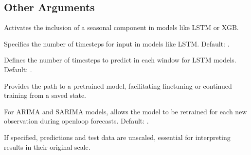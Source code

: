 \documentclass[letterpaper,10pt,english]{sphinxmanual}
\begin{document}
\subsection{Other Arguments}
\label{\detokenize{docs/parser_arguments:other-arguments}}\begin{description}
\sphinxAtStartPar
Activates the inclusion of a seasonal component in models like LSTM or XGB.

\sphinxAtStartPar
Specifies the number of timesteps for input in models like LSTM. Default: .

\sphinxAtStartPar
Defines the number of timesteps to predict in each window for LSTM models. Default: .

\sphinxAtStartPar
Provides the path to a pre\sphinxhyphen{}trained model, facilitating fine\sphinxhyphen{}tuning or continued training from a saved state.

\sphinxAtStartPar
For ARIMA and SARIMA models, allows the model to be retrained for each new observation during open\sphinxhyphen{}loop forecasts. Default: .

\sphinxAtStartPar
If specified, predictions and test data are unscaled, essential for interpreting results in their original scale.

\end{description}
\end{document}
